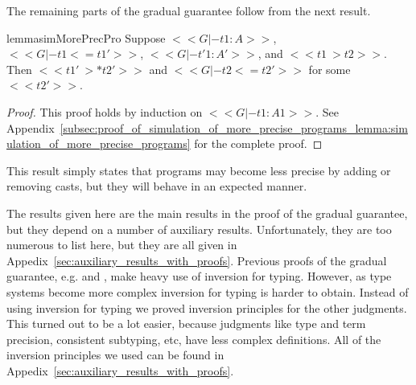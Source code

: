 The remaining parts of the gradual guarantee follow from the next
result.
\begin{restatable}{lemma}{simMorePrecPro}
  \label{lemma:simulation_of_more_precise_programs}
  Suppose $<<G |- t1 : A>>$, $<<G |- t1 <= t1'>>$, $<<G |- t'1 : A'>>$, and $<<t1 ~> t2>>$.
  Then $<<t1' ~>* t2'>>$ and $<<G |- t2 <= t2'>>$ for some $<<t2'>>$.
\end{restatable}
\begin{proof}
  This proof holds by induction on $<<G |- t1 : A1>>$.  See
  Appendix~\ref{subsec:proof_of_simulation_of_more_precise_programs_lemma:simulation_of_more_precise_programs}
  for the complete proof.
\end{proof}
This result simply states that programs may become less precise by
adding or removing casts, but they will behave in an expected manner.

The results given here are the main results in the proof of the
gradual guarantee, but they depend on a number of auxiliary results.
Unfortunately, they are too numerous to list here, but they are all
given in Appedix~\ref{sec:auxiliary_results_with_proofs}.  Previous
proofs of the gradual guarantee, e.g. \cite{Siek:2015} and
\cite{Garcia:2016}, make heavy use of inversion for typing.  However,
as type systems become more complex inversion for typing is harder to
obtain.  Instead of using inversion for typing we proved inversion
principles for the other judgments.  This turned out to be a lot
easier, because judgments like type and term precision, consistent
subtyping, etc, have less complex definitions.  All of the inversion
principles we used can be found in
Appedix~\ref{sec:auxiliary_results_with_proofs}.

